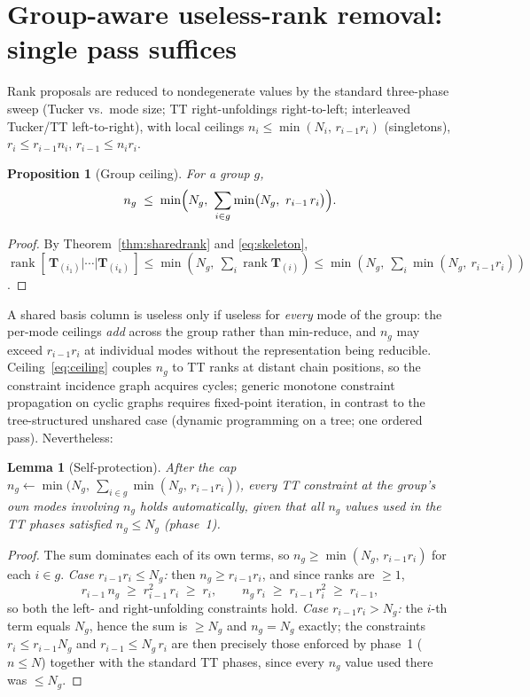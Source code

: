 \documentclass[11pt]{article}
\newtheorem{lemma}[theorem]{Lemma}
\newtheorem{proposition}[theorem]{Proposition}
\theoremstyle{definition}
\theoremstyle{remark}
\newcommand{\T}{\boldsymbol{T}}
\newcommand{\rank}{\operatorname{rank}}
\begin{document}
\section{Group-aware useless-rank removal: single pass suffices}
\label{sec:removal}

Rank proposals are reduced to nondegenerate values by the standard
three-phase sweep (Tucker vs.\ mode size; TT right-unfoldings right-to-left;
interleaved Tucker/TT left-to-right), with local ceilings
$n_i \leq \min(N_i,\, r_{i-1} r_i)$ (singletons),
$r_i \leq r_{i-1} n_i$, $r_{i-1} \leq n_i r_i$.

\begin{proposition}[Group ceiling]\label{prop:ceiling}
For a group $g$,
\begin{equation}\label{eq:ceiling}
n_g \;\leq\;
\min\Bigl( N_g,\ \sum_{i \in g} \min\bigl( N_g,\ r_{i-1}\, r_i \bigr) \Bigr).
\end{equation}
\end{proposition}

\begin{proof}
By Theorem~\ref{thm:sharedrank} and \eqref{eq:skeleton},
$\rank[\,\T_{(i_1)}|\cdots|\T_{(i_k)}\,]
\leq \min(N_g,\ \sum_i \rank \T_{(i)})
\leq \min(N_g,\ \sum_i \min(N_g,\ r_{i-1} r_i))$.
\end{proof}

A shared basis column is useless only if useless for \emph{every} mode of the
group: the per-mode ceilings \emph{add} across the group rather than
min-reduce, and $n_g$ may exceed $r_{i-1} r_i$ at individual modes without
the representation being reducible. Ceiling~\eqref{eq:ceiling} couples $n_g$
to TT ranks at distant chain positions, so the constraint incidence graph
acquires cycles; generic monotone constraint propagation on cyclic graphs
requires fixed-point iteration, in contrast to the tree-structured unshared
case (dynamic programming on a tree; one ordered pass). Nevertheless:

\begin{lemma}[Self-protection]\label{lem:selfprotect}
After the cap
$n_g \leftarrow \min\bigl(N_g,\ \sum_{i\in g} \min(N_g,\, r_{i-1}r_i)\bigr)$,
every TT constraint at the group's own modes involving $n_g$ holds
automatically, given that all $n_g$ values used in the TT phases satisfied
$n_g \leq N_g$ (phase~1).
\end{lemma}

\begin{proof}
The sum dominates each of its own terms, so
$n_g \geq \min(N_g,\, r_{i-1} r_i)$ for each $i \in g$.
\emph{Case $r_{i-1} r_i \leq N_g$:} then $n_g \geq r_{i-1} r_i$, and since
ranks are $\geq 1$,
\[
r_{i-1}\, n_g \;\geq\; r_{i-1}^2\, r_i \;\geq\; r_i,
\qquad
n_g\, r_i \;\geq\; r_{i-1}\, r_i^2 \;\geq\; r_{i-1},
\]
so both the left- and right-unfolding constraints hold.
\emph{Case $r_{i-1} r_i > N_g$:} the $i$-th term equals $N_g$, hence the sum
is $\geq N_g$ and $n_g = N_g$ exactly; the constraints
$r_i \leq r_{i-1} N_g$ and $r_{i-1} \leq N_g\, r_i$ are then precisely those
enforced by phase~1 ($n \leq N$) together with the standard TT phases, since
every $n_g$ value used there was $\leq N_g$.
\end{proof}
\end{document}
